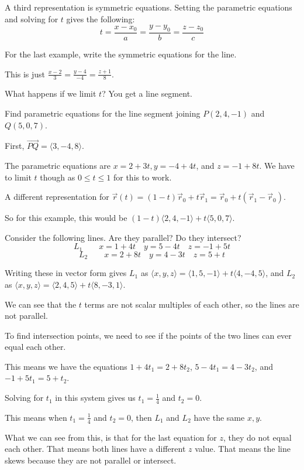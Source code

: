 \documentclass[../calc3.tex]{subfiles}
\begin{document}
\pagebreak
A third representation is symmetric equations. Setting the parametric equations and solving for $t$ gives the following:
\[ t = \frac{x-x_0}{a} = \frac{y-y_0}{b} = \frac{z-z_0}{c} \]

\begin{example}
    For the last example, write the symmetric equations for the line.

    This is just $\frac{x-2}{3}=\frac{y-4}{-4}=\frac{z+1}{8}$.
\end{example}
What happens if we limit $t$? You get a line segment.

\begin{example}
    Find parametric equations for the line segment joining $P(2,4,-1)$ and $Q(5,0,7)$.

    First, $\overrightarrow{PQ}=\langle 3,-4,8\rangle$.

    The parametric equations are $x=2+3t, y=-4+4t$, and $z=-1+8t$. We have to limit $t$ though as $0\leq t\leq 1$ for this to work.

    A different representation for $\vec{r}(t)=(1-t)\vec{r}_0+t\vec{r}_1=\vec{r}_0+t(\vec{r}_1-\vec{r}_0)$.

    So for this example, this would be $(1-t)\langle 2,4,-1\rangle + t\langle 5,0,7\rangle$.
\end{example}

\begin{example}
    Consider the following lines. Are they parallel? Do they intersect?
    \[ L_1 \qquad x=1+4t \quad y=5-4t \quad z=-1+5t\]
    \[ L_2 \qquad x=2+8t \quad y=4-3t \quad z=5+t \]

    Writing these in vector form gives $L_1$ as $\langle x,y,z\rangle = \langle 1,5,-1\rangle + t\langle 4,-4,5\rangle$, and $L_2$ as $\langle x,y,z\rangle = \langle 2,4,5\rangle + t\langle 8,-3,1\rangle$.

    We can see that the $t$ terms are not scalar multiples of each other, so the lines are not parallel.

    To find intersection points, we need to see if the points of the two lines can ever equal each other.

    This means we have the equations $1+4t_1=2+8t_2$, $5-4t_1=4-3t_2$, and $-1+5t_1=5+t_2$.

    Solving for $t_1$ in this system gives us $t_1=\frac{1}{4}$ and $t_2=0$.

    This means when $t_1=\frac{1}{4}$ and $t_2=0$, then $L_1$ and $L_2$ have the same $x,y$.

    What we can see from this, is that for the last equation for $z$, they do not equal each other. That means both lines have a different $z$ value. That means the line skews because they are not parallel or intersect.
\end{example}
\end{document}
